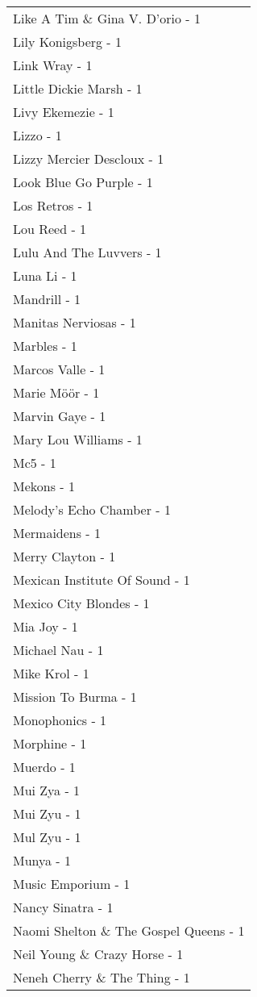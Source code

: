 \documentclass[
]{article}
\begin{document}
\begin{longtable}{l}
Like A Tim \& Gina V. D'orio - 1 \\ 
Lily Konigsberg - 1 \\ 
Link Wray - 1 \\ 
Little Dickie Marsh - 1 \\ 
Livy Ekemezie - 1 \\ 
Lizzo - 1 \\ 
Lizzy Mercier Descloux - 1 \\ 
Look Blue Go Purple - 1 \\ 
Los Retros - 1 \\ 
Lou Reed - 1 \\ 
Lulu And The Luvvers - 1 \\ 
Luna Li - 1 \\ 
Mandrill - 1 \\ 
Manitas Nerviosas - 1 \\ 
Marbles - 1 \\ 
Marcos Valle - 1 \\ 
Marie Möör - 1 \\ 
Marvin Gaye - 1 \\ 
Mary Lou Williams - 1 \\ 
Mc5 - 1 \\ 
Mekons - 1 \\ 
Melody's Echo Chamber - 1 \\ 
Mermaidens - 1 \\ 
Merry Clayton - 1 \\ 
Mexican Institute Of Sound - 1 \\ 
Mexico City Blondes - 1 \\ 
Mia Joy - 1 \\ 
Michael Nau - 1 \\ 
Mike Krol - 1 \\ 
Mission To Burma - 1 \\ 
Monophonics - 1 \\ 
Morphine - 1 \\ 
Muerdo - 1 \\ 
Mui Zya - 1 \\ 
Mui Zyu - 1 \\ 
Mul Zyu - 1 \\ 
Munya - 1 \\ 
Music Emporium - 1 \\ 
Nancy Sinatra - 1 \\ 
Naomi Shelton \& The Gospel Queens - 1 \\ 
Neil Young \& Crazy Horse - 1 \\ 
Neneh Cherry \& The Thing - 1 \\ 

\end{longtable}
\end{document}
